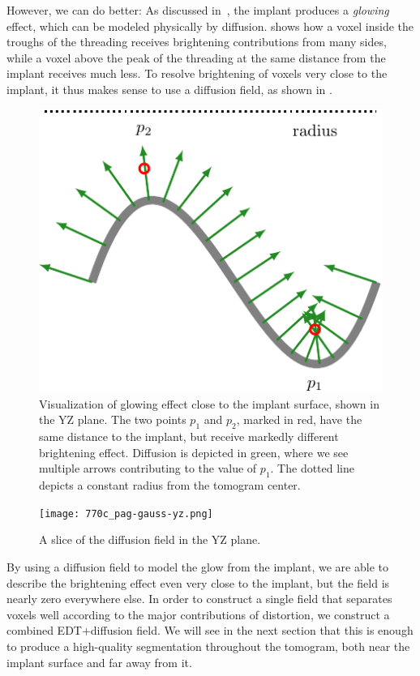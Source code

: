 \documentclass[pdflatex,sn-mathphys]{sn-jnl}%
\theoremstyle{thmstyleone}%
\theoremstyle{thmstyletwo}%
\theoremstyle{thmstylethree}%
\begin{document}
However, we can do better: As discussed in~, the implant produces a \textit{glowing} effect, which
can be modeled physically by diffusion.  shows
how a voxel inside the troughs of the threading receives brightening contributions from many sides, while a voxel above the peak of the threading at
the same distance from the implant receives much less. To resolve brightening of voxels very close to the implant, it thus makes sense
to use a diffusion field, as shown in . 


\begin{figure}
    \centering
    \includegraphics{glowing-crop}
    \caption{Visualization of glowing effect close to the implant surface, shown in the YZ plane. 
        The two points $p_1$ and $p_2$, marked in red, have the same distance to the implant, but receive markedly different brightening effect.
        Diffusion is depicted in green, where we see multiple arrows contributing to the value of $p_1$. The dotted line depicts a constant radius from the tomogram center.}
    \label{fig:edt-vs-diffusion}
\end{figure}


\begin{figure}
    \texttt{[image: 770c\_pag-gauss-yz.png]}
    \caption{A slice of the diffusion field in the YZ plane.}
    \label{fig:field-slice}
\end{figure}

By using a diffusion field to model the glow from the implant, we are able to describe the brightening effect even very close to the implant, but the field is nearly
zero everywhere else. In order
to construct a single field that separates voxels well according to the major contributions of distortion, we construct a combined EDT+diffusion field. We will see
in the next section that this is enough to produce a high-quality segmentation throughout the tomogram, both near the implant surface and far away from it.
\end{document}
